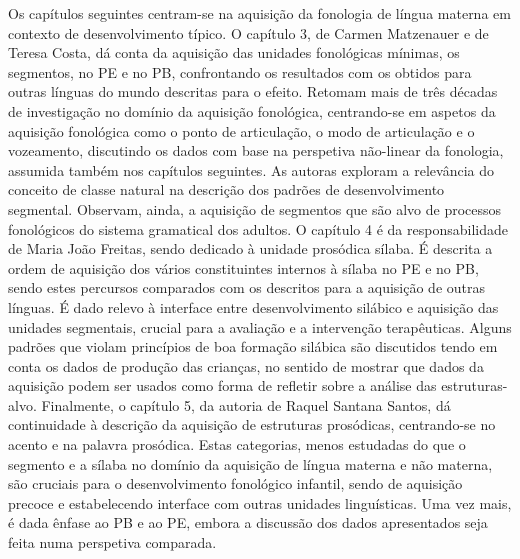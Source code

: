 \begin{refsection}
Os capítulos seguintes centram-se na aquisição da fonologia de língua materna em contexto de desenvolvimento típico. O capítulo 3, de Carmen Matzenauer e de Teresa Costa, dá conta da aquisição das unidades fonológicas mínimas, os segmentos, no PE e no PB, confrontando os resultados com os obtidos para outras línguas do mundo descritas para o efeito. Retomam mais de três décadas de investigação no domínio da aquisição fonológica, centrando-se em aspetos da aquisição fonológica como o ponto de articulação, o modo de articulação e o vozeamento, discutindo os dados com base na perspetiva não-linear da fonologia, assumida também nos capítulos seguintes. As autoras exploram a relevância do conceito de classe natural na descrição dos padrões de desenvolvimento segmental. Observam, ainda, a aquisição de segmentos que são alvo de processos fonológicos do sistema gramatical dos adultos. O capítulo 4 é da responsabilidade de Maria João Freitas, sendo dedicado à unidade prosódica sílaba. É descrita a ordem de aquisição dos vários constituintes internos à sílaba no PE e no PB, sendo estes percursos comparados com os descritos para a aquisição de outras línguas. É dado relevo à interface entre desenvolvimento silábico e aquisição das unidades segmentais, crucial para a avaliação e a intervenção terapêuticas. Alguns padrões que violam princípios de boa formação silábica são discutidos tendo em conta os dados de produção das crianças, no sentido de mostrar que dados da aquisição podem ser usados como forma de refletir sobre a análise das estruturas-alvo. Finalmente, o capítulo 5, da autoria de Raquel Santana Santos, dá continuidade à descrição da aquisição de estruturas prosódicas, centrando-se no acento e na palavra prosódica. Estas categorias, menos estudadas do que o segmento e a sílaba no domínio da aquisição de língua materna e não materna, são cruciais para o desenvolvimento fonológico infantil, sendo de aquisição precoce e estabelecendo interface com outras unidades linguísticas. Uma vez mais, é dada ênfase ao PB e ao PE, embora a discussão dos dados apresentados seja feita numa perspetiva comparada. 


\end{refsection}
